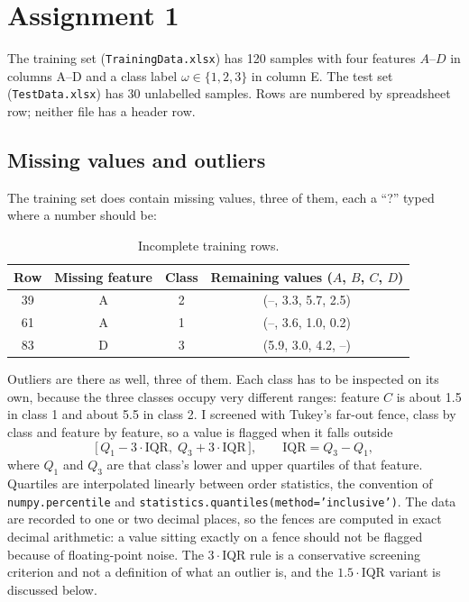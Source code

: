\section{Assignment 1}

The training set (\texttt{TrainingData.xlsx}) has 120 samples with four features $A$--$D$ in columns A--D and a class label
$\omega \in \{1,2,3\}$ in column E. The test set (\texttt{TestData.xlsx}) has 30 unlabelled samples. Rows are numbered by
spreadsheet row; neither file has a header row.

\subsection{Missing values and outliers}

The training set does contain missing values, three of them, each a ``?'' typed where a number should be:

\begin{table}[htbp]
\centering
\footnotesize
\caption{Incomplete training rows.}
\begin{tabular}{@{}cccc@{}}
\toprule
Row & Missing feature & Class & Remaining values ($A$, $B$, $C$, $D$) \\
\midrule
39 & A & 2 & (--, 3.3, 5.7, 2.5) \\
61 & A & 1 & (--, 3.6, 1.0, 0.2) \\
83 & D & 3 & (5.9, 3.0, 4.2, --) \\
\bottomrule
\end{tabular}
\end{table}

Outliers are there as well, three of them. Each class has to be inspected on its own, because the three classes occupy very
different ranges: feature $C$ is about 1.5 in class 1 and about 5.5 in class 2. I screened with Tukey's far-out fence, class by
class and feature by feature, so a value is flagged when it falls outside
\[
\bigl[\,Q_1 - 3\cdot \mathrm{IQR},\; Q_3 + 3\cdot \mathrm{IQR}\,\bigr],
\qquad \mathrm{IQR} = Q_3 - Q_1,
\]
where $Q_1$ and $Q_3$ are that class's lower and upper quartiles of that feature. Quartiles are interpolated linearly between
order statistics, the convention of \texttt{numpy.percentile} and \texttt{statistics.quantiles(method='inclusive')}. The data are
recorded to one or two decimal places, so the fences are computed in exact decimal arithmetic: a value sitting exactly on a
fence should not be flagged because of floating-point noise. The $3\cdot$IQR rule is a conservative screening criterion and not
a definition of what an outlier is, and the $1.5\cdot$IQR variant is discussed below.

